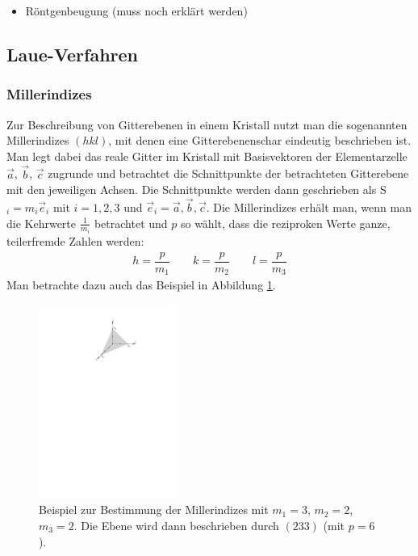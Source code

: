 \documentclass[11pt, a4paper]{article}
\begin{document}
\begin{itemize}
  \item Röntgenbeugung (muss noch erklärt werden)
\end{itemize}

\subsection{Laue-Verfahren}

\subsubsection{Millerindizes}

Zur Beschreibung von Gitterebenen in einem Kristall nutzt man die sogenannten Millerindizes $(hkl)$, mit denen eine Gitterebenenschar eindeutig beschrieben ist.
Man legt dabei das reale Gitter im Kristall mit Basisvektoren der Elementarzelle $\vec{a}$, $\vec{b}$, $\vec{c}$ zugrunde und betrachtet die Schnittpunkte der betrachteten Gitterebene mit den jeweiligen Achsen.
Die Schnittpunkte werden dann geschrieben als S$_i=m_i\vec{e}_i$ mit $i=1,2,3$ und $\vec{e}_i= \vec{a}, \vec{b}, \vec{c}$.
Die Millerindizes erhält man, wenn man die Kehrwerte $\frac{1}{m_i}$ betrachtet und $p$ so wählt, dass die reziproken Werte ganze, teilerfremde Zahlen werden\cite{demtroeder}:
\begin{align}
h=\dfrac{p}{m_1} \quad\quad k=\dfrac{p}{m_2} \quad\quad l=\dfrac{p}{m_3}
\end{align}
Man betrachte dazu auch das Beispiel in Abbildung \ref{fig:millerindizes}.
\begin{figure}[h]
\centering
\includegraphics[width=0.4\textwidth]{./grafiken/millerindizes.pdf}
\caption{Beispiel zur Bestimmung der Millerindizes mit $m_1=3$, $m_2=2$, $m_3=2$. Die Ebene wird dann beschrieben durch $(233)$ (mit $p=6$).}
\label{fig:millerindizes}
\end{figure}
\end{document}
